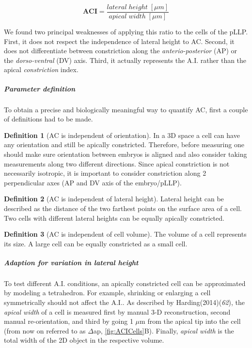 \documentclass[10pt, b5paper, singlespacinge, twoside]{reedthesis} %
\theoremstyle{definition}
\newtheorem{definition}{Definition}[chapter]
\theoremstyle{definition}
\theoremstyle{definition}
\theoremstyle{remark}
\begin{document}
\[\mathbf{ACI} = \frac{lateral\;height\;[\mu m]}{apical\;width\;[\mu m]}\]

\noindent We found two principal weaknesses of applying this ratio to the cells of the pLLP. First, it does not respect the independence of lateral height to AC. Second, it does not differentiate between constriction along the \emph{anterio-posterior} (AP) or the \emph{dorso-ventral} (DV) axis. Third, it actually represents the A.I. rather than the apical \emph{constriction} index.

\hypertarget{ACI-param}{%
\subparagraph{Parameter definition}\label{ACI-param}}

To obtain a precise and biologically meaningful way to quantify AC, first a couple of definitions had to be made.
\begin{definition}[AC is independent of orientation]
\protect\hypertarget{def:unnamed-chunk-3}{}{\label{def:unnamed-chunk-3} {} }In a 3D space a cell can have any orientation and still be apically constricted. Therefore, before measuring one should make sure orientation between embryos is aligned and also consider taking measurements along two different directions. Since apical constriction is not necessarily isotropic, it is important to consider constriction along 2 perpendicular axes (AP and DV axis of the embryo/pLLP).
\end{definition}
\begin{definition}[AC is independent of lateral height]
\protect\hypertarget{def:unnamed-chunk-4}{}{\label{def:unnamed-chunk-4} {} }Lateral height can be described as the distance of the two farthest points on the surface area of a cell. Two cells with different lateral heights can be equally apically constricted.
\end{definition}
\begin{definition}[AC is independent of cell volume]
\protect\hypertarget{def:unnamed-chunk-5}{}{\label{def:unnamed-chunk-5} {} }The volume of a cell represents its size. A large cell can be equally constricted as a small cell.
\end{definition}
\hypertarget{ACI-lat}{%
\subparagraph{Adaption for variation in lateral height}\label{ACI-lat}}

To test different A.I. conditions, an apically constricted cell can be approximated by modeling a tetrahedron. For example, shrinking or enlarging a cell symmetrically should not affect the A.I.. As described by Harding(2014)(\emph{62}), the \emph{apical width} of a cell is measured first by manual 3-D reconstruction, second manual re-orientation, and third by going 1 \(\mu\)m from the apical tip into the cell (from now on referred to as \(\Delta\)ap, \ref{fig:ACICells}B). Finally, \emph{apical width} is the total width of the 2D object in the respective volume.
\end{document}
